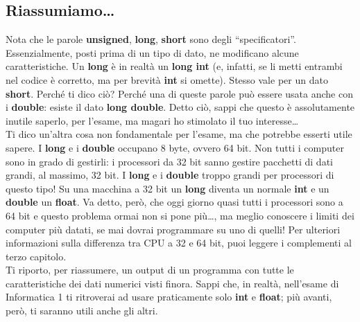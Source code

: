 	\subsection{Riassumiamo\ldots}
	Nota che le parole \textbf{unsigned}, \textbf{long}, \textbf{short} sono degli ``specificatori''. Essenzialmente, posti prima di un tipo di dato, ne modificano alcune caratteristiche. Un \textbf{long} è in realtà un \textbf{long int} (e, infatti, se li metti entrambi nel codice è corretto, ma per brevità \textbf{int} si omette). Stesso vale per un dato \textbf{short}. Perché ti dico ciò? Perché una di queste parole può essere usata anche con i \textbf{double}: esiste il dato \textbf{long double}. Detto ciò, sappi che questo è assolutamente inutile saperlo, per l'esame, ma magari ho stimolato il tuo interesse\ldots \\
	
	Ti dico un'altra cosa non fondamentale per l'esame, ma che potrebbe esserti utile sapere. I \textbf{long} e i \textbf{double} occupano 8 byte, ovvero 64 bit. Non tutti i computer sono in grado di gestirli: i processori da 32 bit sanno gestire pacchetti di dati grandi, al massimo, 32 bit. I \textbf{long} e i \textbf{double} troppo grandi per processori di questo tipo! Su una macchina a 32 bit un \textbf{long} diventa un normale \textbf{int} e un \textbf{double} un \textbf{float}. Va detto, però, che oggi giorno quasi tutti i processori sono a 64 bit e questo problema ormai non si pone più\ldots, ma meglio conoscere i limiti dei computer più datati, se mai dovrai programmare su uno di quelli! Per ulteriori informazioni sulla differenza tra CPU a 32 e 64 bit, puoi leggere i complementi al terzo capitolo.\\
	
	
	Ti riporto, per riassumere, un output di un programma con tutte le caratteristiche dei dati numerici visti finora. Sappi che, in realtà, nell'esame di Informatica 1 ti ritroverai ad usare praticamente solo \textbf{int} e \textbf{float}; più avanti, però, ti saranno utili anche gli altri.
	
